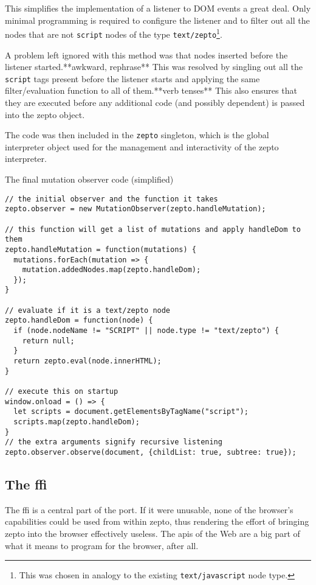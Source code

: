 \documentclass[oneside,11pt,xetex]{scrbook}
\begin{document}
This simplifies the implementation of a listener to DOM events a great deal. Only minimal programming
is required to configure the listener and to filter out all the nodes that are not \texttt{script} nodes
of the type \texttt{text/zepto}\footnote{This was chosen in analogy to the existing \texttt{text/javascript}
node type.}.

A problem left ignored with this method was that nodes inserted before the listener started.**awkward, rephrase** This was resolved by
singling out all the \texttt{script} tags present before the listener starts and applying the
same filter/evaluation function to all of them.**verb tenses** This also ensures that they are executed before any
additional code (and possibly dependent) is passed into the zepto object.

The code was then included in the \texttt{zepto} singleton, which is the global interpreter object
used for the management and interactivity of the zepto interpreter.

\begin{listing}[H]
\caption{The final mutation observer code (simplified)}
\begin{verbatim}
// the initial observer and the function it takes
zepto.observer = new MutationObserver(zepto.handleMutation);

// this function will get a list of mutations and apply handleDom to them
zepto.handleMutation = function(mutations) {
  mutations.forEach(mutation => {
    mutation.addedNodes.map(zepto.handleDom);
  });
}

// evaluate if it is a text/zepto node
zepto.handleDom = function(node) {
  if (node.nodeName != "SCRIPT" || node.type != "text/zepto") {
    return null;
  }
  return zepto.eval(node.innerHTML);
}

// execute this on startup
window.onload = () => {
  let scripts = document.getElementsByTagName("script");
  scripts.map(zepto.handleDom);
}
// the extra arguments signify recursive listening
zepto.observer.observe(document, {childList: true, subtree: true});
\end{verbatim}
\end{listing}

\subsection{The \gls{ffi}}
\label{sec:ffi}

The \gls{ffi} is a central part of the port. If it were unusable, none of the browser's
capabilities could be used from within zepto, thus rendering the effort of bringing zepto into
the browser effectively useless. The \gls{api}s of the Web are a big part of what it means to
program for the browser, after all.
\end{document}
